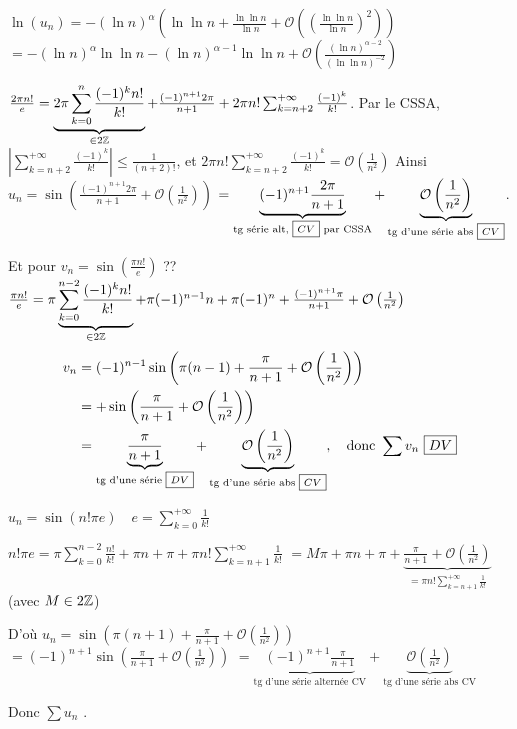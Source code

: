 \begin{solution}
$\ln(u_n) = -(\ln n)^\alpha \left( \ln \ln n + \frac{\ln \ln n}{\ln n} + \mathcal{O}\left(\left(\frac{\ln \ln n}{\ln n}\right)^2\right) \right)$
$= -(\ln n)^\alpha \ln \ln n - (\ln n)^{\alpha-1} \ln \ln n + \mathcal{O}\left( \frac{(\ln n)^{\alpha-2}}{(\ln \ln n)^{-2}} \right)$

$\frac{2\pi n!}{e} = \underbrace{2\pi \sum_{k=0}^n \frac{(-1)^k n!}{k!}}_{\in 2\mathbb Z} + \frac{(-1)^{n+1} 2\pi}{n+1} + 2\pi n! \sum_{k=n+2}^{+\infty} \frac{(-1)^k}{k!}$.
Par le CSSA, $\left| \sum_{k=n+2}^{+\infty} \frac{(-1)^k}{k!} \right| \leq \frac{1}{(n+2)!}$, et $2\pi n! \sum_{k=n+2}^{+\infty} \frac{(-1)^k}{k!} = \mathcal{O}\left(\frac{1}{n^2}\right)$
Ainsi $u_n = \sin\left( \frac{(-1)^{n+1} 2\pi}{n+1} + \mathcal{O}\left(\frac{1}{n^2}\right) \right)$
$= \underbrace{(-1)^{n+1} \frac{2\pi}{n+1}}_{\text{tg série alt, \boxed{CV} par CSSA}} + \underbrace{\mathcal{O}\left(\frac{1}{n^2}\right)}_{\text{tg d'une série abs \boxed{CV}}}$.

Et pour $v_n = \sin\left(\frac{\pi n!}{e}\right)$ ??
$\frac{\pi n!}{e} = \pi \underbrace{\sum_{k=0}^{n-2} \frac{(-1)^k n!}{k!}}_{\in 2\mathbb Z} + \pi(-1)^{n-1} n + \pi(-1)^n + \frac{(-1)^{n+1}\pi}{n+1} + \mathcal{O}\left(\frac{1}{n^2}\right)$
\begin{align*}
v_n &= (-1)^{n-1} \sin\left( \pi(n-1) + \frac{\pi}{n+1} + \mathcal{O}\left(\frac{1}{n^2}\right) \right) \\
&= + \sin\left( \frac{\pi}{n+1} + \mathcal{O}\left(\frac{1}{n^2}\right) \right) \\
&= \underbrace{\frac{\pi}{n+1}}_{\text{tg d'une série \boxed{DV}}} + \underbrace{\mathcal{O}\left(\frac{1}{n^2}\right)}_{\text{tg d'une série abs \boxed{CV}}}, \quad \text{donc } \sum v_n \text{ \boxed{DV}}
\end{align*}

$u_n = \sin(n! \pi e) \quad e = \sum_{k=0}^{+\infty} \frac{1}{k!}$

$n! \pi e = \pi \sum_{k=0}^{n-2} \frac{n!}{k!} + \pi n + \pi + \pi n! \sum_{k=n+1}^{+\infty} \frac{1}{k!}$
$= M \pi + \pi n + \pi + \underbrace{\frac{\pi}{n+1} + \mathcal{O}\left(\frac{1}{n^2}\right)}_{= \pi n! \sum_{k=n+1}^{+\infty} \frac{1}{k!}}$ \quad (avec $M \in 2\mathbb Z$)

D'où $u_n = \sin\left( \pi(n+1) + \frac{\pi}{n+1} + \mathcal{O}\left(\frac{1}{n^2}\right) \right)$
$= (-1)^{n+1} \sin\left( \frac{\pi}{n+1} + \mathcal{O}\left(\frac{1}{n^2}\right) \right)$
$= \underbrace{(-1)^{n+1} \frac{\pi}{n+1}}_{\text{tg d'une série alternée CV}} + \underbrace{\mathcal{O}\left(\frac{1}{n^2}\right)}_{\text{tg d'une série abs CV}}$

Donc $\sum u_n$ .
\end{solution}

